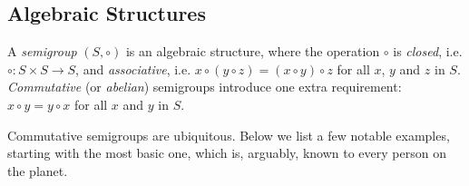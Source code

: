 \subsection{Algebraic Structures}\label{subsec:algstr}

A \emph{semigroup} $(S, \circ)$ is an algebraic structure, where the operation
$\circ$ is \emph{closed}, i.e. $\circ : S\times S \rightarrow S$, and
\emph{associative}, i.e.
$x \circ (y \circ z) = (x \circ y) \circ z$ for all $x$, $y$ and $z$ in $S$.
\emph{Commutative} (or \emph{abelian}) semigroups introduce one extra
requirement: $x \circ y = y \circ x$ for all $x$ and $y$ in $S$.

Commutative semigroups are ubiquitous. Below we list a few
notable examples, starting with the most basic one, which is, arguably, known
to every person on the planet.

